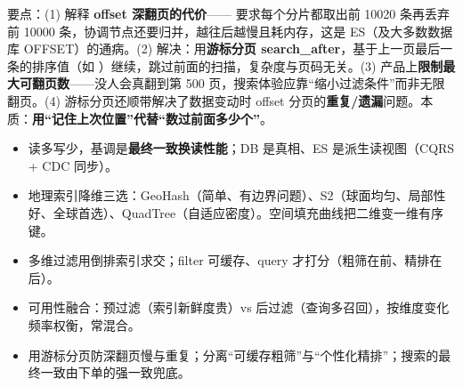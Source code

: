 \begin{followup}
要点：(1) 解释 \textbf{offset 深翻页的代价}—— 要求每个分片都取出前 10020 条再丢弃前 10000 条，协调节点还要归并，越往后越慢且耗内存，这是 ES（及大多数数据库 OFFSET）的通病。(2) 解决：用\textbf{游标分页 search\_after}，基于上一页最后一条的排序值（如 ）继续，跳过前面的扫描，复杂度与页码无关。(3) 产品上\textbf{限制最大可翻页数}——没人会真翻到第 500 页，搜索体验应靠“缩小过滤条件”而非无限翻页。(4) 游标分页还顺带解决了数据变动时 offset 分页的\textbf{重复/遗漏}问题。本质：\textbf{用“记住上次位置”代替“数过前面多少个”}。
\end{followup}

\begin{keypoint}[本章速记]
\begin{itemize}
  \item 读多写少，基调是\textbf{最终一致换读性能}；DB 是真相、ES 是派生读视图（CQRS + CDC 同步）。
  \item 地理索引降维三选：GeoHash（简单、有边界问题）、S2（球面均匀、局部性好、全球首选）、QuadTree（自适应密度）。空间填充曲线把二维变一维有序键。
  \item 多维过滤用倒排索引求交；filter 可缓存、query 才打分（粗筛在前、精排在后）。
  \item 可用性融合：预过滤（索引新鲜度贵）vs 后过滤（查询多召回），按维度变化频率权衡，常混合。
  \item 用游标分页防深翻页慢与重复；分离“可缓存粗筛”与“个性化精排”；搜索的最终一致由下单的强一致兜底。
\end{itemize}
\end{keypoint}
